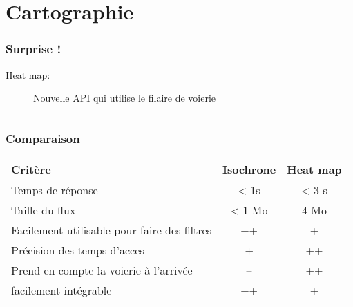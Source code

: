 \documentclass[table]{beamer}
\begin{document}
\section{Cartographie}


  
\begin{frame}
  \frametitle{Surprise !}
  \begin{description}
  \item[Heat map:] Nouvelle API qui utilise le filaire de voierie
  \end{description}

  \begin{columns}
  \end{columns}
\end{frame}
 
\begin{frame}
  \frametitle{Comparaison}

  \centering
  \begin{tabular} {|l|c|c|}
  \hline
  Critère & Isochrone & Heat map \\
  \hline
  Temps de réponse & < 1s &  < 3 s \\
  \hline
  Taille du flux & < 1 Mo & 4 Mo \\
  \hline
  Facilement utilisable pour faire des filtres & ++ & + \\
  \hline
   Précision des temps d'acces & + & ++ \\
  \hline
  Prend en compte la voierie à l'arrivée & -- & ++ \\
  \hline
  facilement intégrable & ++ & + \\
  \hline
  \end{tabular}

\end{frame}
\end{document}
